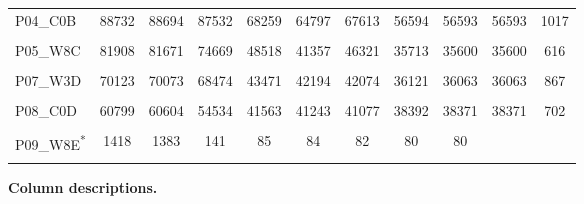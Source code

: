 \documentclass[
  10pt,
  letterpaper,
  DIV=11,
  numbers=noendperiod]{scrartcl}
\begin{document}
\begin{table}[H]
\begin{threeparttable}
\begin{tabular}[t]{lcccccccccc}
P04\_C0B & 88732 & 88694 & 87532 & 68259 & 64797 & 67613 & 56594 & 56593 & 56593 & 1017\\
\addlinespace
\cellcolor{gray!6}{P05\_W3C\textsuperscript{*}} & \cellcolor{gray!6}{809} & \cellcolor{gray!6}{797} & \cellcolor{gray!6}{412} & \cellcolor{gray!6}{308} & \cellcolor{gray!6}{302} & \cellcolor{gray!6}{302} & \cellcolor{gray!6}{296} & \cellcolor{gray!6}{296} & \cellcolor{gray!6}{} & \cellcolor{gray!6}{}\\
P05\_W8C & 81908 & 81671 & 74669 & 48518 & 41357 & 46321 & 35713 & 35600 & 35600 & 616\\
\cellcolor{gray!6}{P06\_C0C} & \cellcolor{gray!6}{67419} & \cellcolor{gray!6}{67399} & \cellcolor{gray!6}{66656} & \cellcolor{gray!6}{51055} & \cellcolor{gray!6}{50634} & \cellcolor{gray!6}{50362} & \cellcolor{gray!6}{45851} & \cellcolor{gray!6}{45850} & \cellcolor{gray!6}{45850} & \cellcolor{gray!6}{954}\\
\addlinespace
P07\_W3D & 70123 & 70073 & 68474 & 43471 & 42194 & 42074 & 36121 & 36063 & 36063 & 867\\
\cellcolor{gray!6}{P07\_W8D} & \cellcolor{gray!6}{15435} & \cellcolor{gray!6}{15417} & \cellcolor{gray!6}{14955} & \cellcolor{gray!6}{9488} & \cellcolor{gray!6}{9426} & \cellcolor{gray!6}{9427} & \cellcolor{gray!6}{9172} & \cellcolor{gray!6}{9172} & \cellcolor{gray!6}{9172} & \cellcolor{gray!6}{335}\\
P08\_C0D & 60799 & 60604 & 54534 & 41563 & 41243 & 41077 & 38392 & 38371 & 38371 & 702\\
\addlinespace
\cellcolor{gray!6}{P09\_W3E} & \cellcolor{gray!6}{55927} & \cellcolor{gray!6}{55764} & \cellcolor{gray!6}{51382} & \cellcolor{gray!6}{35722} & \cellcolor{gray!6}{35410} & \cellcolor{gray!6}{35168} & \cellcolor{gray!6}{29155} & \cellcolor{gray!6}{29102} & \cellcolor{gray!6}{29102} & \cellcolor{gray!6}{745}\\
P09\_W8E\textsuperscript{*} & 1418 & 1383 & 141 & 85 & 84 & 82 & 80 & 80 &  & \\
\cellcolor{gray!6}{P10\_C0E} & \cellcolor{gray!6}{96531} & \cellcolor{gray!6}{96492} & \cellcolor{gray!6}{95256} & \cellcolor{gray!6}{80877} & \cellcolor{gray!6}{68681} & \cellcolor{gray!6}{70013} & \cellcolor{gray!6}{64805} & \cellcolor{gray!6}{64636} & \cellcolor{gray!6}{64636} & \cellcolor{gray!6}{812}\\
\bottomrule
\end{tabular}
\begin{tablenotes}[para]
\item \textbf{Column descriptions. } 

\end{tablenotes}
\end{threeparttable}
\end{table}
\end{document}
